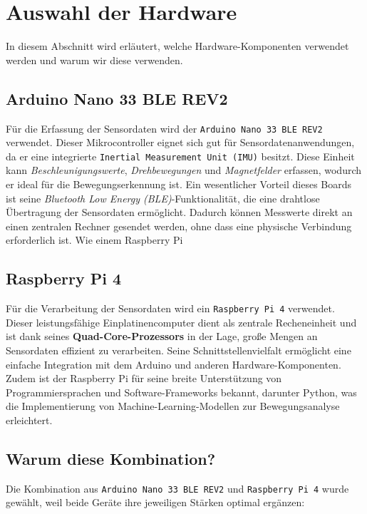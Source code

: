 \section{Auswahl der Hardware}
In diesem Abschnitt wird erläutert, welche Hardware-Komponenten  verwendet werden und warum wir diese verwenden.
\subsection{Arduino Nano 33 BLE REV2}

Für die Erfassung der Sensordaten wird der \texttt{Arduino Nano 33 BLE REV2} verwendet. Dieser Mikrocontroller eignet sich gut für Sensordatenanwendungen, da er eine integrierte \texttt{Inertial Measurement Unit (IMU)} besitzt. Diese Einheit kann \emph{Beschleunigungswerte}, \emph{Drehbewegungen} und \emph{Magnetfelder} erfassen, wodurch er ideal für die Bewegungserkennung ist.  
Ein wesentlicher Vorteil dieses Boards ist seine \emph{Bluetooth Low Energy (BLE)}-Funktionalität, die eine drahtlose Übertragung der Sensordaten ermöglicht. Dadurch können Messwerte direkt an einen zentralen Rechner gesendet werden, ohne dass eine physische Verbindung erforderlich ist. Wie einem Raspberry Pi

\subsection{Raspberry Pi 4}

Für die Verarbeitung der Sensordaten wird ein \texttt{Raspberry Pi 4} verwendet. Dieser leistungsfähige Einplatinencomputer dient als zentrale Recheneinheit und ist dank seines \textbf{Quad-Core-Prozessors} in der Lage, große Mengen an Sensordaten effizient zu verarbeiten. Seine Schnittstellenvielfalt ermöglicht eine einfache Integration mit dem Arduino und anderen Hardware-Komponenten. Zudem ist der Raspberry Pi für seine breite Unterstützung von Programmiersprachen und Software-Frameworks bekannt, darunter Python, was die Implementierung von Machine-Learning-Modellen zur Bewegungsanalyse erleichtert.

\subsection{Warum diese Kombination?}

Die Kombination aus \texttt{Arduino Nano 33 BLE REV2} und \texttt{Raspberry Pi 4} wurde gewählt, weil beide Geräte ihre jeweiligen Stärken optimal ergänzen:

